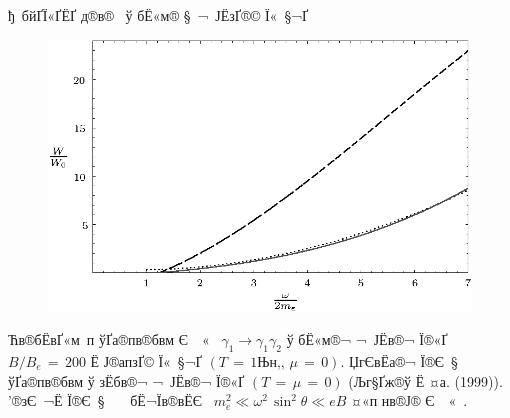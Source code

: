 


\begin{Slide}{ђ бйҐЇ«Ґ­ЁҐ д®в®­  ў бЁ«м­® § ¬ Ј­ЁзҐ­­®© Ї« §¬Ґ} 

\begin{center}

\begin{figure}[htb]
\centerline{\includegraphics*[scale=1.]{fig6.eps}}

\vspace{5mm}

\end{figure}

Ћв­®бЁвҐ«м­ п ўҐа®пв­®бвм Є ­ «  $\gamma_1 \to \gamma_1 \gamma_2$ 
ў бЁ«м­®¬ ¬ Ј­Ёв­®¬ Ї®«Ґ $B/B_e \, = \, 200$ Ё Ј®апзҐ© Ї« §¬Ґ $(T \, = \, 
1 \mbox{Њн‚},\, \mu \, = \, 0)$. 
Џг­ЄвЁа®¬ Ї®Є § ­  ўҐа®пв­®бвм ў 
зЁбв®¬ ¬ Ј­Ёв­®¬ Ї®«Ґ $(T \, = \, \mu \, = \, 0)$ 
(Љг§­Ґж®ў Ё ¤а. (1999)). ’®зЄ ¬Ё Ї®Є § ­   бЁ¬Їв®вЁЄ  
$m_e^2 \ll \omega^2 \, \sin^2{\theta} \ll eB$ ¤«п нв®Ј® Є ­ « .

\end{center}

\end{Slide}


